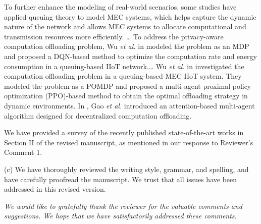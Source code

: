 \documentclass[12pt,draftclsnofoot,onecolumn]{IEEEtran}
\newenvironment{my}[2]%
{\begin{list}{}%
{\setlength{\rightmargin}{#1}\setlength{\leftmargin}{#2}}%


 \item[]{}

} {\end{list}}
\begin{document}
\begin{enumerate}
\begin{my}{1cm}{1cm}
{{	To further enhance the modeling of real-world scenarios, some studies have applied queuing theory to model MEC systems, which helps capture the dynamic nature of the network and allows MEC systems to allocate computational and transmission resources more efficiently.
    \dots
	To address the privacy-aware computation offloading problem, Wu \textit{et al.} in \cite{wu2024combining} modeled the problem as an MDP and proposed a DQN-based method to optimize the computation rate and energy consumption in a queuing-based IIoT network.\dots
    Wu \textit{et al.} in \cite{wu2023multi} investigated the computation offloading problem in a queuing-based MEC IIoT system. They modeled the problem as a POMDP and proposed a multi-agent proximal policy optimization (PPO)-based method to obtain the optimal offloading strategy in dynamic environments.
	In \cite{gao2022large}, Gao \textit{et al.} introduced an attention-based multi-agent algorithm designed for decentralized computation offloading.
	
	
	
}}
\end{my}\vspace{6mm}

We have provided a survey of the recently published state-of-the-art works in Section II of the revised manuscript, as mentioned in our response to Reviewer's Comment 1.\newline

(c) We have thoroughly reviewed the writing style, grammar, and spelling, and have carefully proofread the manuscript. We trust that all issues have been addressed in this revised version. 

\vspace{10mm}



\end{enumerate}

\textit{We would like to gratefully thank the reviewer for the valuable comments and suggestions. We hope that we have satisfactorily addressed these comments.}\newline




	\setcounter{section}{1}
\setcounter{table}{0}
\end{document}

